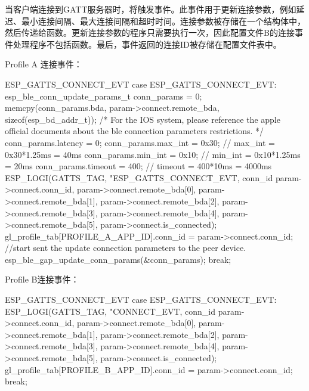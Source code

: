 \documentclass[lang=cn,newtx,10pt,scheme=chinese]{elegantbook}
\begin{document}
当客户端连接到GATT服务器时，将触发事件。此事件用于更新连接参数，例如延迟、最小连接间隔、最大连接间隔和超时时间。连接参数被存储在一个结构体中，然后传递给函数。更新连接参数的程序只需要执行一次，因此配置文件B的连接事件处理程序不包括函数。最后，事件返回的连接ID被存储在配置文件表中。

Profile A 连接事件：

\begin{mycode}{ESP\_GATTS\_CONNECT\_EVT}
case ESP_GATTS_CONNECT_EVT: {  
     esp_ble_conn_update_params_t conn_params = {0};  
     memcpy(conn_params.bda, param->connect.remote_bda, sizeof(esp_bd_addr_t));
     /* For the IOS system, please reference the apple official documents about the ble connection parameters restrictions. */
     conn_params.latency = 0;  
     conn_params.max_int = 0x30;    // max_int = 0x30*1.25ms = 40ms  
     conn_params.min_int = 0x10;    // min_int = 0x10*1.25ms = 20ms   
     conn_params.timeout = 400;     // timeout = 400*10ms = 4000ms  
     ESP_LOGI(GATTS_TAG, "ESP_GATTS_CONNECT_EVT, conn_id %
             param->connect.conn_id,  
             param->connect.remote_bda[0],  
             param->connect.remote_bda[1],  
             param->connect.remote_bda[2],  
             param->connect.remote_bda[3],  
             param->connect.remote_bda[4],  
             param->connect.remote_bda[5],  
             param->connect.is_connected);
 	 gl_profile_tab[PROFILE_A_APP_ID].conn_id = param->connect.conn_id;
	 //start sent the update connection parameters to the peer device.
	 esp_ble_gap_update_conn_params(&conn_params);
	 break;
    }
\end{mycode}

Profile B连接事件：

\begin{mycode}{ESP\_GATTS\_CONNECT\_EVT}
case ESP_GATTS_CONNECT_EVT:  
     ESP_LOGI(GATTS_TAG, "CONNECT_EVT, conn_id %
              param->connect.conn_id,  
              param->connect.remote_bda[0],  
              param->connect.remote_bda[1],  
              param->connect.remote_bda[2],  
              param->connect.remote_bda[3],  
              param->connect.remote_bda[4],  
              param->connect.remote_bda[5],  
              param->connect.is_connected);
	  gl_profile_tab[PROFILE_B_APP_ID].conn_id = param->connect.conn_id;
	  break;
\end{mycode}
\end{document}
